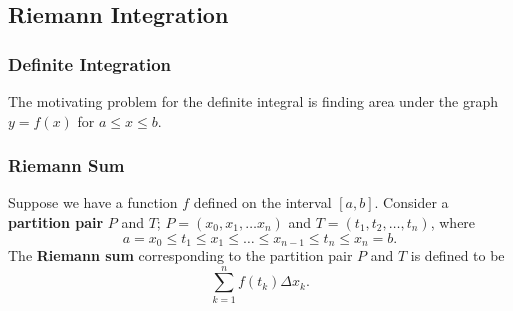 \documentclass{beamer}
\begin{document}
\subsection{Riemann Integration}

\begin{frame}
\frametitle{Definite Integration}
\begin{center}
\end{center}
The motivating problem for the definite integral is finding area under the graph $y = f(x)$ for $a \leq x \leq b$.
\end{frame}

\begin{frame}
\frametitle{Riemann Sum}
\begin{Definition}
Suppose we have a function $f$ defined on the interval $[a, b]$. Consider a {\bf partition pair} $P$ and $T$; $P = (x_0, x_1, \ldots x_n)$ and $T = (t_1, t_2, \ldots, t_n)$, where
$$
a = x_0 \leq t_1 \leq x_1 \leq \ldots\leq x_{n-1} \leq t_n \leq x_n = b.
$$ 
The {\bf Riemann sum} corresponding to the partition pair $P$ and $T$ is defined to be
$$
\sum_{k = 1}^n f(t_k)\Delta x_k.
$$
\end{Definition}
\end{frame}
\end{document}
